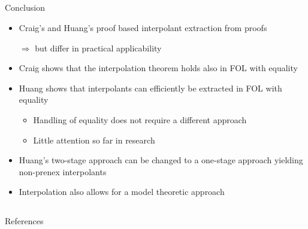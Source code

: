 \documentclass[final,compress]{beamer}
\begin{document}
\subsection{}
\begin{frame}{Conclusion}
	\begin{itemize}
		\item Craig's and Huang's proof based interpolant extraction from proofs

			$\Rightarrow$ but differ in practical applicability 

		\item Craig shows that the interpolation theorem holds also in FOL with equality
		\item Huang shows that interpolants can efficiently be extracted in FOL with equality

			\begin{itemize}
				\item Handling of equality does not require a different approach
				\item Little attention so far in research
			\end{itemize}

		\item Huang's two-stage approach can be changed to a one-stage approach yielding non-prenex interpolants

		\item Interpolation also allows for a model theoretic approach

	\end{itemize}
\end{frame}

\subsection{}
\begin{frame}{References}
	
\end{frame}
\end{document}
